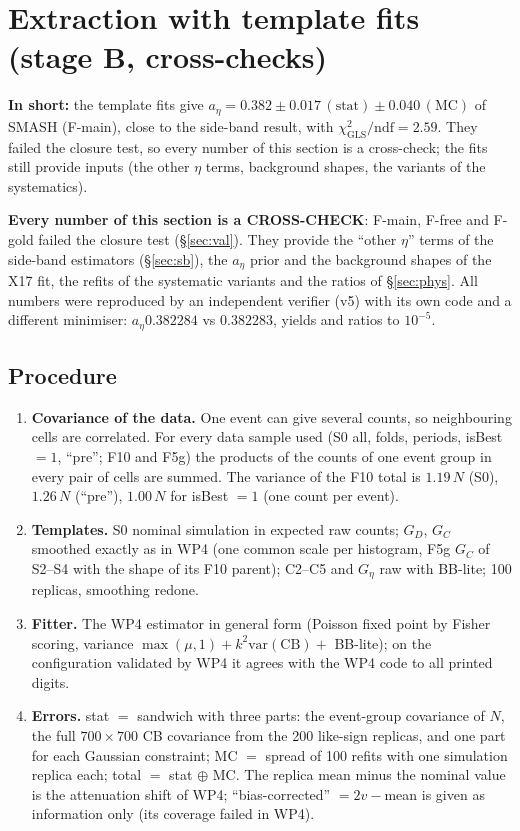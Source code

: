\documentclass[11pt,a4paper]{article}
\newcommand{\aEta}{\ensuremath{a_\eta}\xspace}
\newcommand{\Geta}{\ensuremath{G_\eta}\xspace}
\newcommand{\notebox}[1]{\par\noindent\colorbox{orange!10}{\parbox{\dimexpr\linewidth-2\fboxsep\relax}{#1}}\par}
\newcommand{\tipbox}[1]{\par\noindent\colorbox{blue!6}{\parbox{\dimexpr\linewidth-2\fboxsep\relax}{#1}}\par}
\newcommand{\inshort}[1]{\tipbox{\textbf{In short:} #1}}%
\begin{document}
\section{Extraction with template fits (stage B, cross-checks)}
\label{sec:fit}
\inshort{the template fits give $\aEta=0.382\pm0.017\,(\mathrm{stat})\pm0.040\,(\mathrm{MC})$ of SMASH (F-main), close to the side-band result, with $\chi^2_{\mathrm{GLS}}/\mathrm{ndf}=2.59$. They failed the closure test, so every number of this section is a cross-check; the fits still provide inputs (the other $\eta$ terms, background shapes, the variants of the systematics).}
\notebox{\textbf{Every number of this section is a CROSS-CHECK}: F-main, F-free and F-gold failed the closure test (\S\ref{sec:val}).
They provide the ``other $\eta$'' terms of the side-band estimators (\S\ref{sec:sb}), the \aEta prior and the background shapes of the
X17 fit, the refits of the systematic variants and the ratios of \S\ref{sec:phys}. All numbers were reproduced by an independent
verifier (v5) with its own code and a different minimiser: \aEta $0.382284$ vs $0.382283$, yields and ratios to $10^{-5}$.}

\subsection{Procedure}
\begin{enumerate}\setlength{\itemsep}{0pt}
\item \textbf{Covariance of the data.} One event can give several counts, so neighbouring cells are correlated. For every data sample used
      (S0 all, folds, periods, isBest $=1$, ``pre''; F10 and F5g) the products of the counts of one event group in every pair of cells
      are summed. The variance of the F10 total is $1.19\,N$ (S0), $1.26\,N$ (``pre''), $1.00\,N$ for isBest $=1$ (one count per event).
\item \textbf{Templates.} S0 nominal simulation in expected raw counts; $G_D$, $G_C$ smoothed exactly as in WP4 (one common scale per
      histogram, F5g $G_C$ of S2--S4 with the shape of its F10 parent); C2--C5 and \Geta raw with BB-lite; 100 replicas, smoothing redone.
\item \textbf{Fitter.} The WP4 estimator in general form (Poisson fixed point by Fisher scoring, variance $\max(\mu,1)+k^2\mathrm{var(CB)}+$
      BB-lite); on the configuration validated by WP4 it agrees with the WP4 code to all printed digits.
\item \textbf{Errors.} stat $=$ sandwich with three parts: the event-group covariance of $N$, the full $700\times700$ CB covariance from the
      200 like-sign replicas, and one part for each Gaussian constraint; MC $=$ spread of 100 refits with one simulation replica each;
      total $=$ stat $\oplus$ MC. The replica mean minus the nominal value is the attenuation shift of WP4; ``bias-corrected'' $=2v-$mean
      is given as information only (its coverage failed in WP4).
\end{enumerate}
\end{document}
